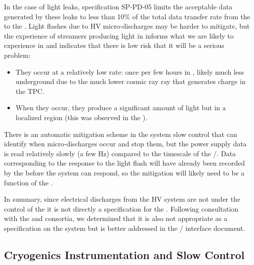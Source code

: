 In the case of light leaks, specification SP-PD-05 limits the acceptable data generated by these leaks to  less than 10\% of the total data transfer rate from the  to the .
Light flashes due to HV micro-discharges may be harder to mitigate, but the experience of streamers producing light in  informs what we are likely to experience in  and indicates that there is low risk that it will be a serious problem:

\begin{itemize}
  
\item They occur at a relatively low rate: once per few hours in , likely much less underground due to the much lower cosmic ray ray that generates charge in the TPC.

\item When they occur, they produce a significant amount of light but in a localized region (this was observed in the  ).

\end{itemize}

There is an automatic mitigation scheme in the  system slow control that can identify when micro-discharges occur and stop them, but the power supply data is read relatively slowly (a few Hz) compared to the timescale of the /. Data corresponding to the  response to the light flash will have already been recorded by the  before the  system can respond, so the mitigation will likely need to be a function of the .

In summary, since electrical discharges from the HV system are not under the control of the  it is not directly a specification for the .  
Following consultation with the  and  consortia, we determined that it is also not appropriate as a specification on the  system but is better addressed in the / interface document.


\subsection{Cryogenics Instrumentation and Slow Control}
\label{sec:fdsp-pd-intfc-xeon}

